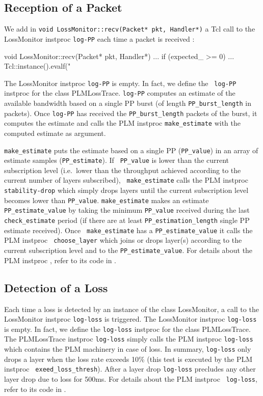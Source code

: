 {\subsection{Reception of a Packet}
\label{sec:PLMReception-Packet}
We add in {\tt void LossMonitor::recv(Packet* pkt, Handler*)} a Tcl call to the
  LossMonitor instproc {\tt log-PP} each time a packet is received :
\begin{program}
  void LossMonitor::recv(Packet* pkt, Handler*)
  {
    ...
    if (expected_ >= 0) {
      ...
      }
    Tcl::instance().evalf("%
    }
\end{program}

The LossMonitor instproc {\tt log-PP} is empty. In fact, we define the {\tt
  log-PP} instproc for the class PLMLossTrace. {\tt log-PP}
computes an estimate of the available bandwidth based on a single PP burst (of
length {\tt PP\_burst\_length} in packets). Once {\tt log-PP} has received the 
  {\tt PP\_burst\_length} packets of the burst, it computes the estimate and
  calls the PLM instproc {\tt make\_estimate} with the computed estimate as
  argument. 

{\tt make\_estimate} puts the estimate based on a single PP
({\tt PP\_value}) in an array of  estimate samples ({\tt PP\_estimate}). If {\tt
  PP\_value} is lower than the current subscription level (i.e.~lower than the
throughput achieved according to the current number of layers subscribed), {\tt
  make\_estimate} calls the PLM instproc {\tt stability-drop} which simply drops
layers until the current subscription level becomes lower than {\tt PP\_value}.
{\tt make\_estimate} makes an estimate {\tt PP\_estimate\_value} by taking the
minimum {\tt PP\_value} received during the last {\tt check\_estimate} period
(if there are at
least {\tt PP\_estimation\_length} single PP estimate received). Once {\tt
  make\_estimate} has a {\tt PP\_estimate\_value} it calls the PLM instproc {\tt
  choose\_layer} which joins or drops layer(s) according to the current subscription
level and to the {\tt PP\_estimate\_value}. For details about the PLM instproc
, refer to its code in .



\subsection{Detection of a Loss}
Each time a loss is detected by an instance of the class LossMonitor, a call to
the LossMonitor instproc {\tt log-loss} is triggered. The LossMonitor instproc {\tt log-loss}
is empty. In fact, we define the {\tt log-loss} instproc for the class
PLMLossTrace. The PLMLossTrace instproc {\tt log-loss} simply
calls the PLM instproc {\tt log-loss} which contains the PLM machinery in case
of loss. In summary, {\tt log-loss} only drops a layer when the loss rate
exceeds 10\% (this test is executed by the PLM instproc {\tt
  exeed\_loss\_thresh}). After a layer drop {\tt log-loss} precludes any
other layer drop due to loss for 500ms. For details about the PLM instproc {\tt
  log-loss}, refer to its code in . 

}
